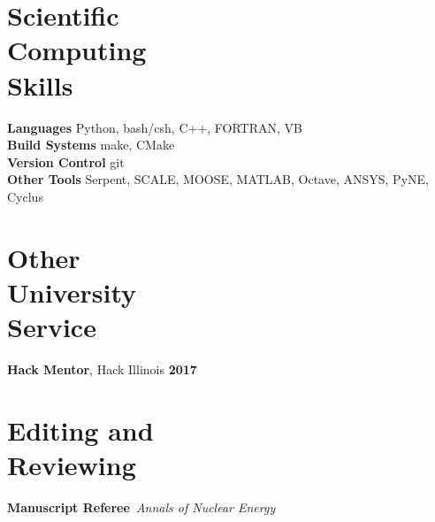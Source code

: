\documentclass[margin,line]{resume}
\begin{document}
\begin{resume}
    \section{\mysidestyle Scientific\\Computing\\Skills}
                \textbf{Languages} \hfill Python, bash/csh, C++, FORTRAN, VB \vspace{.5mm}\\%
                \textbf{Build Systems} \hfill make, CMake\vspace{.5mm}\\%
                \textbf{Version Control} \hfill git\vspace{.5mm}\\%
                \textbf{Other Tools} \hfill Serpent, SCALE, MOOSE, MATLAB, Octave, ANSYS, PyNE, Cyclus \vspace{.5mm}%

    \section{\mysidestyle Other\\University\\Service}
		\textbf{Hack Mentor}, Hack Illinois \hfill \textbf{2017}\vspace{.5mm}\\%

\section{\mysidestyle Editing and\\Reviewing}
    \textbf{Manuscript Referee}~\hfill\emph{Annals of Nuclear Energy}\\%


\end{resume}
\end{document}
